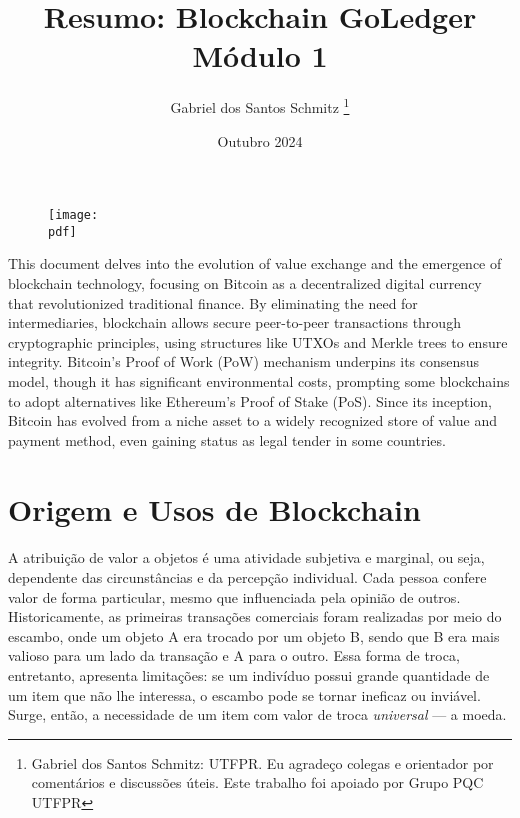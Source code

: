 \documentclass[letterpaper,11pt,leqno]{article}
\newcommand{\pdf}{figures/figures}
\begin{document}
\begin{figure}[t]
	{\texttt{[image: \\pdf]}}
	\vspace{-50pt}
	\label{f:figure1}\end{figure}

\title{Resumo: Blockchain GoLedger Módulo 1}

\author{Gabriel dos Santos Schmitz
	\thanks{Gabriel dos Santos Schmitz: UTFPR. Eu agradeço colegas e orientador
		por comentários e discussões úteis. Este trabalho foi apoiado por Grupo PQC
		UTFPR}}

\date{Outubro 2024}


\begin{titlepage}

	\maketitle

	This document delves into the evolution of value exchange and the emergence of
	blockchain technology, focusing on Bitcoin as a decentralized digital currency
	that revolutionized traditional finance. By eliminating the need for
	intermediaries, blockchain allows secure peer-to-peer transactions through
	cryptographic principles, using structures like UTXOs and Merkle trees to
	ensure integrity. Bitcoin’s Proof of Work (PoW) mechanism underpins its
	consensus model, though it has significant environmental costs, prompting some
	blockchains to adopt alternatives like Ethereum’s Proof of Stake (PoS). Since
	its inception, Bitcoin has evolved from a niche asset to a widely recognized
	store of value and payment method, even gaining status as legal tender in some
	countries.

\end{titlepage}

\section{Origem e Usos de Blockchain}

\paragraph{}
A atribuição de valor a objetos é uma atividade subjetiva e marginal, ou seja,
dependente das circunstâncias e da percepção individual. Cada pessoa confere
valor de forma particular, mesmo que influenciada pela opinião de outros.
Historicamente, as primeiras transações comerciais foram realizadas por meio do
escambo, onde um objeto A era trocado por um objeto B, sendo que B era mais
valioso para um lado da transação e A para o outro. Essa forma de troca,
entretanto, apresenta limitações: se um indivíduo possui grande quantidade de um
item que não lhe interessa, o escambo pode se tornar ineficaz ou inviável.
Surge, então, a necessidade de um item com valor de troca \textit{universal} ---
a moeda.
\end{document}
